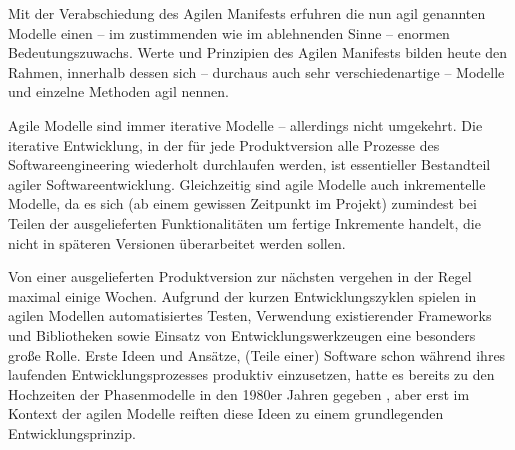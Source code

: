 Mit der Verabschiedung des Agilen Manifests erfuhren die nun agil genannten Modelle einen – im zustimmenden wie im ablehnenden Sinne – enormen Bedeutungszuwachs. Werte und Prinzipien des Agilen Manifests bilden heute den Rahmen, innerhalb dessen sich – durchaus auch sehr verschiedenartige – Modelle und einzelne Methoden agil nennen. 

Agile Modelle sind immer iterative Modelle – allerdings nicht umgekehrt. Die iterative Entwicklung, in der für jede Produktversion alle Prozesse des Softwareengineering wiederholt durchlaufen werden, ist essentieller Bestandteil agiler Softwareentwicklung. Gleichzeitig sind agile Modelle auch inkrementelle Modelle, da es sich (ab einem gewissen Zeitpunkt im Projekt) zumindest bei Teilen der ausgelieferten Funktionalitäten um fertige Inkremente handelt, die nicht in späteren Versionen überarbeitet werden sollen.

Von einer ausgelieferten Produktversion zur nächsten vergehen in der Regel maximal einige Wochen. Aufgrund der kurzen Entwicklungszyklen spielen in agilen Modellen automatisiertes Testen, Verwendung existierender Frameworks und Bibliotheken sowie Einsatz von Entwicklungswerkzeugen eine besonders große Rolle. Erste Ideen und Ansätze, (Teile einer) Software schon während ihres laufenden Entwicklungsprozesses produktiv einzusetzen, hatte es bereits zu den Hochzeiten der Phasenmodelle in den 1980er Jahren gegeben \cite[84-2]{fav14}, aber erst im Kontext der agilen Modelle reiften diese Ideen zu einem grundlegenden Entwicklungsprinzip.

